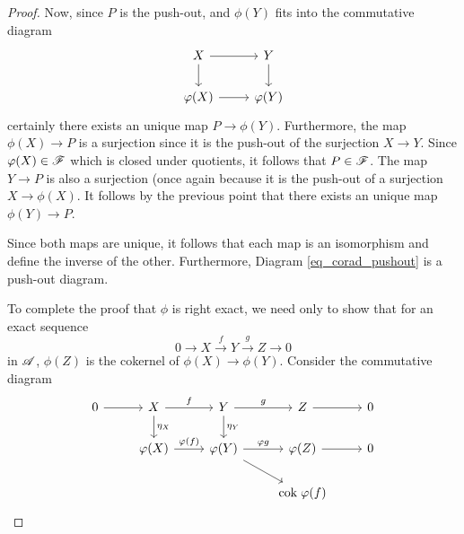 \begin{proof}
Now, since $P$ is the push-out, and $\phi(Y)$ fits into the 
commutative diagram
\begin{equation}\label{eq_corad_pushout}
\begin{tikzcd}
X \arrow{r} \arrow{d} & Y \arrow{d} \\
\phi(X) \arrow{r} &\phi(Y)
\end{tikzcd}
\end{equation}
certainly there exists an unique map $P \to \phi(Y)$. Furthermore,
the map $\phi(X) \to P$ is a surjection since it is the push-out
of the surjection $X \to Y$. Since $\varphi(X) \in \mathscr{F}$ which is
closed under quotients, it follows that $P \in \mathscr{F}$. 
The map $Y \to P$ is also a surjection (once again
because it is the push-out of a surjection $X \to \phi(X)$. It 
follows by the previous point that there exists an unique map
$\phi(Y) \to P$.

Since both maps are unique, it follows that each map is an 
isomorphism and define the inverse of the other. Furthermore,
Diagram \ref{eq_corad_pushout} is a push-out diagram.

To complete the proof that $\phi$ is right exact, we need only to 
show that for an exact sequence 
\[
0 \to X \stackrel{f}{\to} Y \stackrel{g}{\to} Z \to 0
\] 
in $\mathscr{A}$, $\phi(Z)$ is the cokernel of $\phi(X) \to \phi(Y)$. 
Consider the commutative diagram
\[
\begin{tikzcd}
0 \arrow{r} & 
X \arrow{r}{f} \arrow{d}{\eta_X} &
Y \arrow{r}{g} \arrow{d}{\eta_Y}&
Z \arrow{r} &
0 \\
& \phi(X) \arrow{r}{\phi(f)} &
\phi(Y) \arrow{r}{\phi g} \arrow{rd} &
\phi(Z) \arrow{r} &
0 \\
& & & \cok \phi(f)
\end{tikzcd}
\]
\end{proof}
